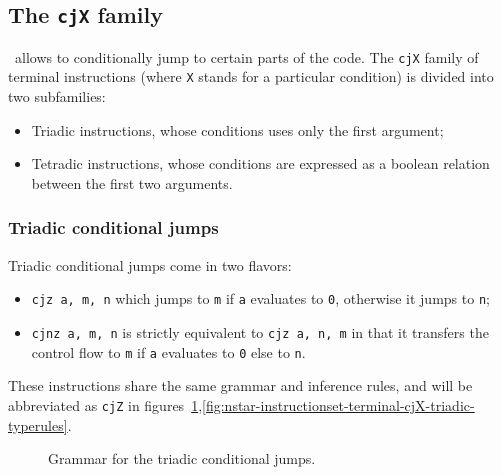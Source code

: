 \subsection{The \texttt{cjX} family}\label{subsec:nstar-instructionset-terminal-cjX}

\nstar\ allows to conditionally jump to certain parts of the code.
The \texttt{cjX} family of terminal instructions (where \texttt{X} stands for a particular condition) is divided into two subfamilies:
\begin{itemize}
	\item Triadic instructions, whose conditions uses only the first argument;
	\item Tetradic instructions, whose conditions are expressed as a boolean relation between the first two arguments.
\end{itemize}

\subsubsection{Triadic conditional jumps}\label{subsubsec:nstar-instructionset-terminal-cjX-triadic}

Triadic conditional jumps come in two flavors:
\begin{itemize}
	\item \texttt{cjz a, m, n} which jumps to \texttt{m} if \texttt{a} evaluates to \texttt{0}, otherwise it jumps to \texttt{n};
	\item \texttt{cjnz a, m, n} is strictly equivalent to \texttt{cjz a, n, m} in that it transfers the control flow to \texttt{m} if \texttt{a} evaluates to \texttt{0} else to \texttt{n}.
\end{itemize}

These instructions share the same grammar and inference rules, and will be abbreviated as \texttt{cjZ} in figures~\ref{fig:nstar-instructionset-terminal-cjX-triadic-grammar},\ref{fig:nstar-instructionset-terminal-cjX-triadic-typerules}.

\begin{figure}[H]
	\centering


	\caption{Grammar for the triadic conditional jumps.}
	\label{fig:nstar-instructionset-terminal-cjX-triadic-grammar}
\end{figure}


